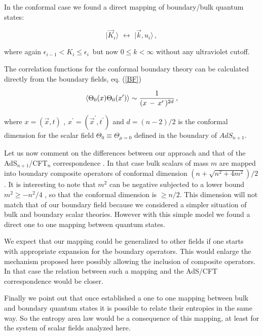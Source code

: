 \documentclass[a4paper,12pt]{article}
\begin{document}
{{In the conformal case we found  a direct mapping of boundary/bulk  quantum states:

\begin{equation}
\vert {\vec K}_i  \rangle \,\,\leftrightarrow \,\,\vert \vec k  , u_i  \rangle\,,
\end{equation}

\noindent where again $\epsilon_{i-1} <  K_i \le \epsilon_i \,$ but now 
$0 \le k < \infty $ without any ultraviolet cutoff.

The correlation functions for the conformal boundary theory can be calculated 
\cite{FGG} directly from the boundary fields, eq. (\ref{BF}) 

\begin{equation}
\langle \Theta_{0}
( x )\Theta_{0}
( x^\prime )\rangle\sim { 1 \over ( x \,-\, x^\prime \,)^{2d} }\,,
\end{equation}

\noindent where $x = (\vec x , t)$ , $x^\prime = (\vec x^\prime  , t^\prime )$
and $d = (n -2)/2 $ is the conformal dimension for the scalar field 
$\Theta_0 \equiv \Theta_{\mu = 0}$ defined in the boundary of  $AdS_{n+1}$.


Let us now comment on the differences between our approach and
that of the \break AdS$_{n+1}$/CFT$_{n}$ correspondence \cite{Malda,GKP,Wi}.
In that case bulk scalars of mass $m$ are mapped into boundary composite 
operators of conformal dimension $( n + \sqrt{n^2 + 4 m^2})/2$. 
It is interesting to note that $m^2$ can be negative subjected to a lower 
bound $m^2\ge -n^2/4$ \cite{QAdS2,Wi}, so that the conformal dimension is 
$\ge n/2$.
This dimension will not match that of our boundary field because we
considered a simpler situation of bulk and boundary scalar theories.
However with this simple model we found a direct one to one mapping 
between quantum states. 
   
We expect that our mapping could  be generalized to other  
fields if one starts with  appropriate expansion for the boundary operators.
This would enlarge the mechanism proposed here possibly
allowing the inclusion of composite operators. 
In that case the relation between such a mapping and the 
AdS/CFT correspondence would be closer.

Finally we point out that once established a  one to one mapping 
between  bulk and boundary quantum states it is possible to relate their 
entropies in the same way. So the entropy area law would 
be a  consequence of this mapping, at least for the system of 
scalar fields analyzed here.


}}
\end{document}
